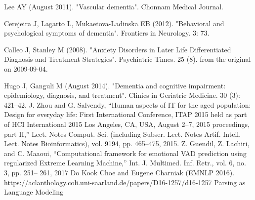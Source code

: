 %
%
%
%
%
\clearpage
{}
%
%
\begin{thebibliography}{99}
%
 Lee AY (August 2011). "Vascular dementia". Chonnam Medical Journal.

Cerejeira J, Lagarto L, Mukaetova-Ladinska EB (2012). "Behavioral and psychological symptoms of dementia". Frontiers in Neurology. 3: 73.


Calleo J, Stanley M (2008). "Anxiety Disorders in Later Life Differentiated Diagnosis and Treatment Strategies". Psychiatric Times. 25 (8).  from the original on 2009-09-04.

Hugo J, Ganguli M (August 2014). "Dementia and cognitive impairment: epidemiology, diagnosis, and treatment". Clinics in Geriatric Medicine. 30 (3): 421–42.
J. Zhou and G. Salvendy, “Human aspects of IT for the aged population: Design for everyday life: First International Conference, ITAP 2015 held as part of HCI International 2015 Los Angeles, CA, USA, August 2–7, 2015 proceedings, part II,” Lect. Notes Comput. Sci. (including Subser. Lect. Notes Artif. Intell. Lect. Notes Bioinformatics), vol. 9194, pp. 465–475, 2015. 
Z. Guendil, Z. Lachiri, and C. Maaoui, “Computational framework for emotional VAD prediction using regularized Extreme Learning Machine,” Int. J. Multimed. Inf. Retr., vol. 6, no. 3, pp. 251– 261, 2017 
Do Kook Choe and Eugene Charniak (EMNLP 2016). https://aclanthology.coli.uni-saarland.de/papers/D16-1257/d16-1257 Parsing as Language Modeling


%
\end{thebibliography}
%
%
%
%
\clearpage
{}
